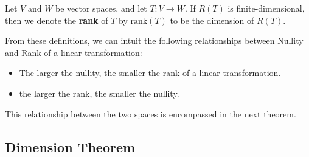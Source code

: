 \begin{definition}[Rank]\label{Rank}
    Let \( V  \) and \( W  \) be vector spaces, and let \( T: V \to W  \). If \( R(T)  \) is finite-dimensional, then we denote the \textbf{rank} of \( T  \) by \( \text{rank}(T) \) to be the dimension of \( R(T) \). 
\end{definition}

From these definitions, we can intuit the following relationships between Nullity and Rank of a linear transformation:
\begin{itemize}
    \item The larger the nullity, the smaller the rank of a linear transformation.
    \item the larger the rank, the smaller the nullity.
\end{itemize}
This relationship between the two spaces is encompassed in the next theorem.

\subsection{Dimension Theorem}

